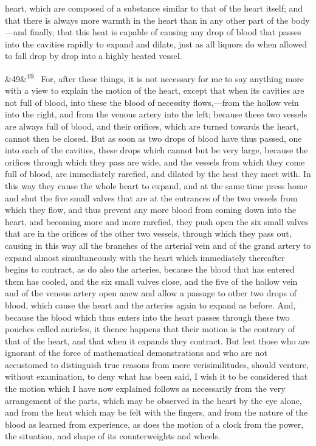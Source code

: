 \documentclass[12pt]{article}
\newcommand{\para}[1][]{\par\noindent\ifx&#1&\else\textsuperscript{\footnotesize #1}~\fi}
\begin{document}
heart, which are composed of a substance similar to that of the heart itself; and that there is always more warmth in the heart than in any other part of the body---and finally, that this heat is capable of causing any drop of blood that passes into the cavities rapidly to expand and dilate, just as all liquors do when allowed to fall drop by drop into a highly heated vessel.

\para[49] For, after these things, it is not necessary for me to say anything more with a view to explain the motion of the heart, except that when its cavities are not full of blood, into these the blood of necessity flows,---from the hollow vein into the right, and from the venous artery into the left; because these two vessels are always full of blood, and their orifices, which are turned towards the heart, cannot then be closed. But as soon as two drops of blood have thus passed, one into each of the cavities, these drops which cannot but be very large, because the orifices through which they pass are wide, and the vessels from which they come full of blood, are immediately rarefied, and dilated by the heat they meet with. In this way they cause the whole heart to expand, and at the same time press home and shut the five small valves that are at the entrances of the two vessels from which they flow, and thus prevent any more blood from coming down into the heart, and becoming more and more rarefied, they push open the six small valves that are in the orifices of the other two vessels, through which they pass out, causing in this way all the branches of the arterial vein and of the grand artery to expand almost simultaneously with the heart which immediately thereafter begins to contract, as do also the arteries, because the blood that has entered them has cooled, and the six small valves close, and the five of the hollow vein and of the venous artery open anew and allow a passage to other two drops of blood, which cause the heart and the arteries again to expand as before. And, because the blood which thus enters into the heart passes through these two pouches called auricles, it thence happens that their motion is the contrary of that of the heart, and that when it expands they contract. But lest those who are ignorant of the force of mathematical demonstrations and who are not accustomed to distinguish true reasons from mere verisimilitudes, should venture, without examination, to deny what has been said, I wish it to be considered that the motion which I have now explained follows as necessarily from the very arrangement of the parts, which may be observed in the heart by the eye alone, and from the heat which may be felt with the fingers, and from the nature of the blood as learned from experience, as does the motion of a clock from the power, the situation, and shape of its counterweights and wheels.
\end{document}
